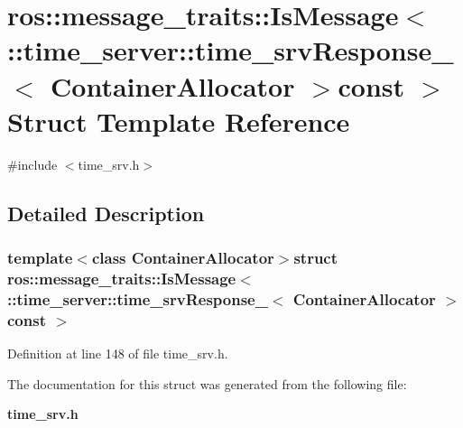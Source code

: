 \section{ros\-:\-:message\-\_\-traits\-:\-:\-Is\-Message$<$ \-:\-:time\-\_\-server\-:\-:time\-\_\-srv\-Response\-\_\-$<$ \-Container\-Allocator $>$const $>$ \-Struct \-Template \-Reference}
\label{structros_1_1message__traits_1_1IsMessage_3_01_1_1time__server_1_1time__srvResponse___3_01ContainerAllocator_01_4const_01_01_4}


{\ttfamily \#include $<$time\-\_\-srv.\-h$>$}



\subsection{\-Detailed \-Description}
\subsubsection*{template$<$class Container\-Allocator$>$struct ros\-::message\-\_\-traits\-::\-Is\-Message$<$ \-::time\-\_\-server\-::time\-\_\-srv\-Response\-\_\-$<$ Container\-Allocator $>$const  $>$}



\-Definition at line 148 of file time\-\_\-srv.\-h.



\-The documentation for this struct was generated from the following file\-:\begin{DoxyCompactItemize}
\item 
{\bf time\-\_\-srv.\-h}\end{DoxyCompactItemize}
